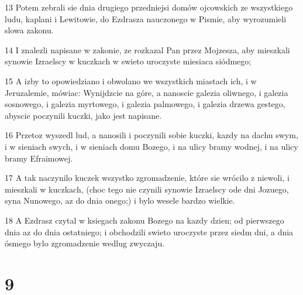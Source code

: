 \par 13 Potem zebrali sie dnia drugiego przedniejsi domów ojcowskich ze wszystkiego ludu, kaplani i Lewitowie, do Ezdrasza nauczonego w Pismie, aby wyrozumieli slowa zakonu.
\par 14 I znalezli napisane w zakonie, ze rozkazal Pan przez Mojzesza, aby mieszkali synowie Izraelscy w kuczkach w swieto uroczyste miesiaca siódmego;
\par 15 A izby to opowiedziano i obwolano we wszystkich miastach ich, i w Jeruzalemie, mówiac: Wynijdzcie na góre, a nanoscie galezia oliwnego, i galezia sosnowego, i galezia myrtowego, i galezia palmowego, i galezia drzewa gestego, abyscie poczynili kuczki, jako jest napisane.
\par 16 Przetoz wyszedl lud, a nanosili i poczynili sobie kuczki, kazdy na dachu swym, i w sieniach swych, i w sieniach domu Bozego, i na ulicy bramy wodnej, i na ulicy bramy Efraimowej.
\par 17 A tak naczynilo kuczek wszystko zgromadzenie, które sie wrócilo z niewoli, i mieszkali w kuczkach, (choc tego nie czynili synowie Izraelscy ode dni Jozuego, syna Nunowego, az do dnia onego;) i bylo wesele bardzo wielkie.
\par 18 A Ezdrasz czytal w ksiegach zakonu Bozego na kazdy dzien; od pierwszego dnia az do dnia ostatniego; i obchodzili swieto uroczyste przez siedm dni, a dnia ósmego bylo zgromadzenie wedlug zwyczaju.

\chapter{9}

